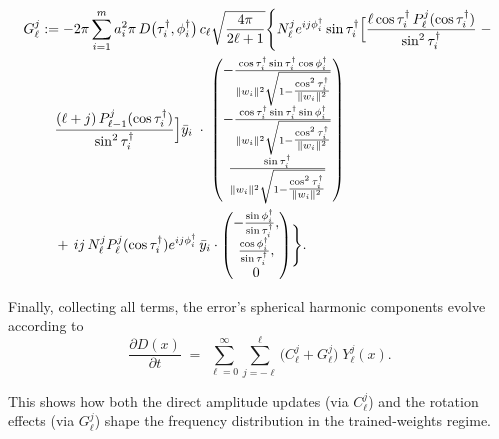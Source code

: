 \documentclass[review,onefignum,onetabnum,onealgnum]{siamart250106}
\numberwithin{theorem}{section}
\begin{document}
\begin{equation}\label{Gelljexact}
\begin{aligned}
    G_{\ell}^j &:= -2\pi\sum_{i=1}^m a_i^2\pi\,D\bigl(\tau_i^\dagger,\phi_i^\dagger\bigr)\,c_{\ell}\sqrt{\frac{4\pi}{2\ell+1}} 
    \Biggl\{
    N_{\ell}^j e^{ij\phi_i^\dagger}\sin\tau_i^\dagger \Bigl[\frac{\ell \cos\tau_i^\dagger\,P_{\ell}^j(\cos\tau_i^\dagger)}{\sin^2\tau_i^\dagger}
    \;-\;\\&\quad
    \frac{ (\ell+j)\,P_{\ell-1}^j(\cos\tau_i^\dagger)}{\sin^2\tau_i^\dagger}\Bigr] 
 \bar{y}_i \;\cdot\;
\begin{pmatrix}
-\frac{\cos\tau_i^\dagger\sin\tau_i^\dagger\cos\phi_i^\dagger}{\|w_i\|^2\sqrt{1-\tfrac{\cos^2\tau_i^\dagger}{\|w_i\|^2}}}\\[4pt]
-\frac{\cos\tau_i^\dagger\sin\tau_i^\dagger\sin\phi_i^\dagger}{\|w_i\|^2\sqrt{1-\tfrac{\cos^2\tau_i^\dagger}{\|w_i\|^2}}}\\[4pt]
\frac{\sin\tau_i^\dagger}{\|w_i\|^2\sqrt{1-\tfrac{\cos^2\tau_i^\dagger}{\|w_i\|^2}}}
\end{pmatrix}\\
&\quad +\,ij\,N_{\ell}^j P_{\ell}^j(\cos\tau_i^\dagger)e^{ij\phi_i^\dagger}\,\bar{y}_i \cdot
\begin{pmatrix}
-\frac{\sin\phi_i^\dagger}{\sin\tau_i^\dagger},\\[3pt]
\frac{\cos\phi_i^\dagger}{\sin\tau_i^\dagger},\\[3pt]
0
\end{pmatrix}
\Biggr\}.
\end{aligned}
\end{equation}


Finally, collecting all terms, the error’s spherical harmonic components evolve according to
\begin{equation}\label{dDelljt}
    \frac{\partial D(x)}{\partial t}
    \;=\;
    \sum_{\ell = 0}^{\infty}\sum_{j = -\ell}^{\ell}\bigl(C_{\ell}^j + G_{\ell}^j\bigr)\;Y_{\ell}^j(x).
\end{equation}

This shows how both the direct amplitude updates (via \(C_{\ell}^j\)) and the rotation effects (via \(G_{\ell}^j\)) shape the frequency distribution in the trained-weights regime.
 
\end{document}
